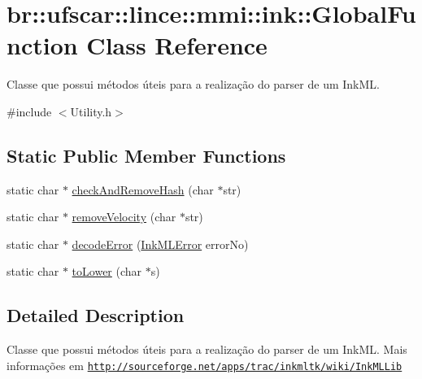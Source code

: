 \hypertarget{classbr_1_1ufscar_1_1lince_1_1mmi_1_1ink_1_1GlobalFunction}{
\section{br::ufscar::lince::mmi::ink::GlobalFunction Class Reference}
\label{classbr_1_1ufscar_1_1lince_1_1mmi_1_1ink_1_1GlobalFunction}
}


Classe que possui métodos úteis para a realização do parser de um InkML.  




{\ttfamily \#include $<$Utility.h$>$}

\subsection*{Static Public Member Functions}
\begin{DoxyCompactItemize}
\item 
static char $\ast$ \hyperlink{classbr_1_1ufscar_1_1lince_1_1mmi_1_1ink_1_1GlobalFunction_a0ef032da8c546e4d12c460efecdffd92}{checkAndRemoveHash} (char $\ast$str)
\item 
static char $\ast$ \hyperlink{classbr_1_1ufscar_1_1lince_1_1mmi_1_1ink_1_1GlobalFunction_a210632b3793a4a8d29cb11eb694548ea}{removeVelocity} (char $\ast$str)
\item 
static char $\ast$ \hyperlink{classbr_1_1ufscar_1_1lince_1_1mmi_1_1ink_1_1GlobalFunction_a05274945e1682ee836877acc4dbab7f8}{decodeError} (\hyperlink{namespacebr_1_1ufscar_1_1lince_1_1mmi_1_1ink_a682c285834346cbf7587dd58c9832fe4}{InkMLError} errorNo)
\item 
static char $\ast$ \hyperlink{classbr_1_1ufscar_1_1lince_1_1mmi_1_1ink_1_1GlobalFunction_ac28d7d2119005e2f55cfa28ec1efce13}{toLower} (char $\ast$s)
\end{DoxyCompactItemize}


\subsection{Detailed Description}
Classe que possui métodos úteis para a realização do parser de um InkML. Mais informações em \href{http://sourceforge.net/apps/trac/inkmltk/wiki/InkMLLib}{\tt http://sourceforge.net/apps/trac/inkmltk/wiki/InkMLLib} 

